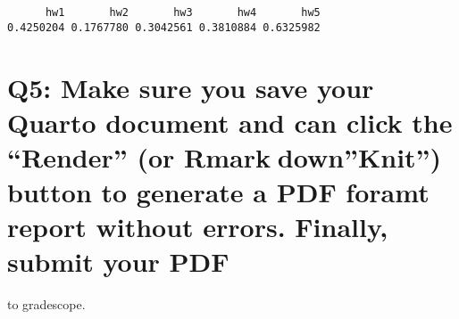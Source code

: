 \documentclass[
  letterpaper,
  DIV=11,
  numbers=noendperiod]{scrartcl}
\begin{document}
\begin{verbatim}
      hw1       hw2       hw3       hw4       hw5 
0.4250204 0.1767780 0.3042561 0.3810884 0.6325982 
\end{verbatim}

\hypertarget{q5-make-sure-you-save-your-quarto-document-and-can-click-the-render-or-rmarkdownknit-button-to-generate-a-pdf-foramt-report-without-errors.-finally-submit-your-pdf}{%
\section{Q5: Make sure you save your Quarto document and can click the
``Render'' (or Rmarkdown''Knit'') button to generate a PDF foramt report
without errors. Finally, submit your
PDF}\label{q5-make-sure-you-save-your-quarto-document-and-can-click-the-render-or-rmarkdownknit-button-to-generate-a-pdf-foramt-report-without-errors.-finally-submit-your-pdf}}

to gradescope.
\end{document}
